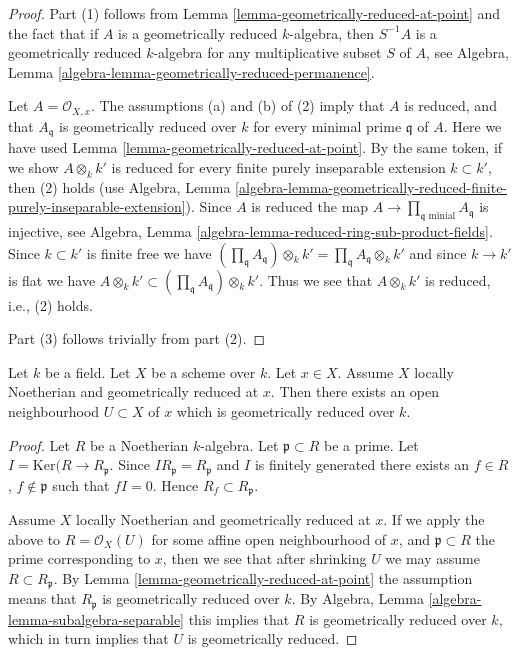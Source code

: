\begin{proof}
Part (1) follows from
Lemma \ref{lemma-geometrically-reduced-at-point}
and the fact that if $A$ is a geometrically reduced
$k$-algebra, then $S^{-1}A$ is a geometrically reduced $k$-algebra for
any multiplicative subset $S$ of $A$, see
Algebra, Lemma \ref{algebra-lemma-geometrically-reduced-permanence}.

\medskip\noindent
Let $A = \mathcal{O}_{X, x}$. The assumptions (a) and (b) of (2) imply
that $A$ is reduced, and that $A_{\mathfrak q}$ is geometrically
reduced over $k$ for every minimal prime $\mathfrak q$ of $A$.
Here we have used
Lemma \ref{lemma-geometrically-reduced-at-point}.
By the same token, if we show $A \otimes_k k'$ is reduced
for every finite purely inseparable extension $k \subset k'$,
then (2) holds (use
Algebra, Lemma
\ref{algebra-lemma-geometrically-reduced-finite-purely-inseparable-extension}).
Since $A$ is reduced the map
$A \to \prod_{\mathfrak q\text{ minial}} A_{\mathfrak q}$
is injective, see
Algebra, Lemma \ref{algebra-lemma-reduced-ring-sub-product-fields}.
Since $k \subset k'$ is finite free we have
$(\prod_{\mathfrak q} A_{\mathfrak q}) \otimes_k k'
=\prod_{\mathfrak q} A_{\mathfrak q} \otimes_k k'$
and since $k \to k'$ is flat we have
$A \otimes_k k' \subset (\prod_{\mathfrak q} A_{\mathfrak q}) \otimes_k k'$.
Thus we see that $A \otimes_k k'$ is reduced, i.e., (2) holds.

\medskip\noindent
Part (3) follows trivially from part (2).
\end{proof}

\begin{lemma}
\label{lemma-Noetherian-geometrically-reduced-at-point}
Let $k$ be a field.
Let $X$ be a scheme over $k$.
Let $x \in X$.
Assume $X$ locally Noetherian and geometrically reduced at $x$.
Then there exists an open neighbourhood $U \subset X$ of $x$
which is geometrically reduced over $k$.
\end{lemma}

\begin{proof}
Let $R$ be a Noetherian $k$-algebra.
Let $\mathfrak p \subset R$ be a prime.
Let $I = \text{Ker}(R \to R_{\mathfrak p}$.
Since $IR_{\mathfrak p} = R_{\mathfrak p}$ and $I$ is finitely generated
there exists an $f \in R$, $f \not \in \mathfrak p$ such that $fI = 0$. 
Hence $R_f \subset R_{\mathfrak p}$.

\medskip\noindent
Assume $X$ locally Noetherian and geometrically reduced at $x$.
If we apply the above to $R = \mathcal{O}_X(U)$ for some affine
open neighbourhood of $x$, and $\mathfrak p \subset R$ the prime
corresponding to $x$, then we see that after shrinking $U$ we may
assume $R \subset R_{\mathfrak p}$. By
Lemma \ref{lemma-geometrically-reduced-at-point} the assumption
means that $R_{\mathfrak p}$ is geometrically reduced over $k$.
By Algebra, Lemma \ref{algebra-lemma-subalgebra-separable}
this implies that $R$ is geometrically reduced over $k$, which
in turn implies that $U$ is geometrically reduced.
\end{proof}

